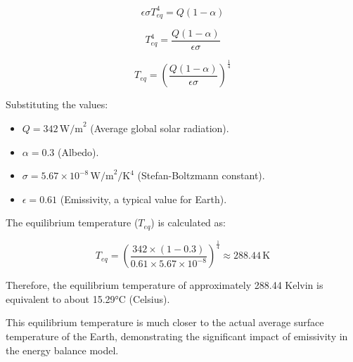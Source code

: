 \documentclass[12pt]{article}
\begin{document}
\begin{equation}
\epsilon\sigma T_{eq}^4 = Q(1 - \alpha)
\end{equation}

\begin{equation}
T_{eq}^4 = \frac{Q(1 - \alpha)}{\epsilon\sigma}
\end{equation}

\begin{equation}
T_{eq} = \left( \frac{Q(1 - \alpha)}{\epsilon\sigma} \right)^{\frac{1}{4}}
\end{equation}

Substituting the values:
\begin{itemize}
    \item $Q = 342 \, \text{W/m}^2$ (Average global solar radiation).
    \item $\alpha = 0.3$ (Albedo).
    \item $\sigma = 5.67 \times 10^{-8} \, \text{W/m}^2/\text{K}^4$ (Stefan-Boltzmann constant).
    \item $\epsilon = 0.61$ (Emissivity, a typical value for Earth).
\end{itemize}

The equilibrium temperature ($T_{eq}$) is calculated as:

\begin{equation}
T_{eq} = \left( \frac{342 \times (1 - 0.3)}{0.61 \times 5.67 \times 10^{-8}} \right)^{\frac{1}{4}} \approx 288.44 \, \text{K}
\end{equation}

Therefore, the equilibrium temperature of approximately 288.44 Kelvin 
is equivalent to about 15.29°C (Celsius).

This equilibrium temperature is much closer to the actual average surface temperature of the Earth, 
demonstrating the significant impact of emissivity 
in the energy balance model.

\end{document}
